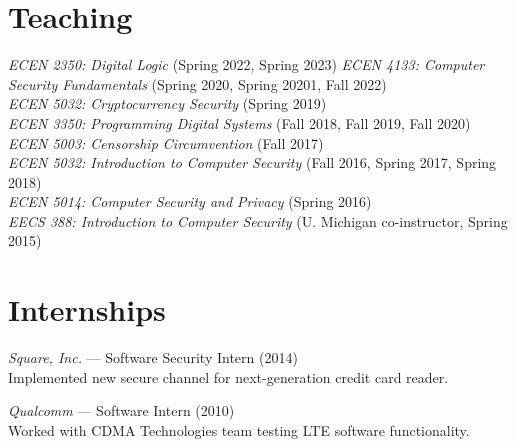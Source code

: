 \documentclass[margin,11pt]{res} %
\begin{document}
\vspace{6pt}
\section{\large Teaching}
    \emph{ECEN 2350: Digital Logic} (Spring 2022, Spring 2023)
    \emph{ECEN 4133: Computer Security Fundamentals} (Spring 2020, Spring 20201, Fall 2022)\\
    \emph{ECEN 5032: Cryptocurrency Security} (Spring 2019)\\
    \emph{ECEN 3350: Programming Digital Systems} (Fall 2018, Fall 2019, Fall 2020)\\
    \emph{ECEN 5003: Censorship Circumvention} (Fall 2017)\\
    \emph{ECEN 5032: Introduction to Computer Security} (Fall 2016, Spring 2017, Spring 2018)\\
    \emph{ECEN 5014: Computer Security and Privacy} (Spring 2016)\\
    \emph{EECS 388: Introduction to Computer Security}  (U. Michigan co-instructor, Spring 2015)\\


\vspace{6pt}
\section{\large Internships}

    \emph{Square, Inc.} --- Software Security Intern (2014) \\
    Implemented new secure channel for next-generation credit card reader.
    
    \emph{Qualcomm} --- Software Intern (2010) \\
    Worked with CDMA Technologies team testing LTE software functionality.
    
\end{document}
